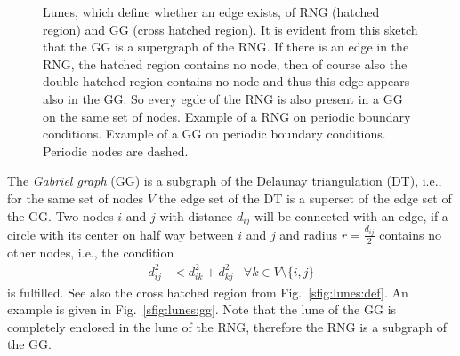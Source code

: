     \begin{figure}[htbp]
        \centering
        \caption[Gabriel and Relative Neighborhood Graph]
        {
             Lunes, which define whether an edge
                exists, of RNG (hatched region) and GG (cross hatched region).
                It is evident from this sketch that the GG is a supergraph
                of the RNG. If there is an edge in the RNG, the hatched
                region contains no node, then of course also the double
                hatched region contains no node and thus this edge appears
                also in the GG. So every egde of the RNG is also present
                in a GG on the same set of nodes.
             Example of a RNG on periodic
                boundary conditions.
             Example of a GG on
                periodic boundary conditions. Periodic nodes are dashed.
        }
        \label{fig:lunes}
    \end{figure}

    The \emph{Gabriel graph} (GG) \cite{Gabriel1969} is a subgraph
    of the Delaunay triangulation \cite{Delaunay1934,Katajainen}
    (DT), i.e., for the same set of nodes \(V\) the edge set of the
    DT is a superset of the edge set of the GG. Two nodes \(i\) and
    \(j\) with distance \(d_{ij}\) will be connected with an edge,
    if a circle with its center on half way between \(i\) and \(j\)
    and radius \(r = \frac{d_{ij}}{2}\) contains no other nodes, i.e., the
    condition
    \begin{align*}
        d^{2}_{ij} &< d^{2}_{ik} + d^{2}_{kj} &\forall k \in V\setminus\{i,j\}
    \end{align*}
    is fulfilled. See
    also the cross hatched region from Fig.~\ref{sfig:lunes:def}. An
    example is given in Fig.~\ref {sfig:lunes:gg}. Note that the
    lune of the GG is completely enclosed in the lune of the RNG,
    therefore the RNG is a subgraph of the GG.

